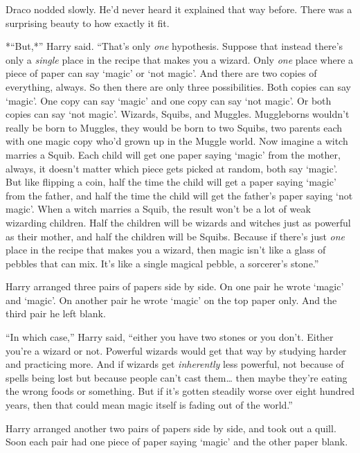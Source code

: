Draco nodded slowly. He'd never heard it explained that way before.
There was a surprising beauty to how exactly it fit.

*``But,*'' Harry said. ``That's only \emph{one} hypothesis. Suppose that
instead there's only a \emph{single} place in the recipe that makes you
a wizard. Only \emph{one} place where a piece of paper can say `magic'
or `not magic'. And there are two copies of everything, always. So then
there are only three possibilities. Both copies can say `magic'. One
copy can say `magic' and one copy can say `not magic'. Or both copies
can say `not magic'. Wizards, Squibs, and Muggles. Muggleborns wouldn't
really be born to Muggles, they would be born to two Squibs, two parents
each with one magic copy who'd grown up in the Muggle world. Now imagine
a witch marries a Squib. Each child will get one paper saying `magic'
from the mother, always, it doesn't matter which piece gets picked at
random, both say `magic'. But like flipping a coin, half the time the
child will get a paper saying `magic' from the father, and half the time
the child will get the father's paper saying `not magic'. When a witch
marries a Squib, the result won't be a lot of weak wizarding children.
Half the children will be wizards and witches just as powerful as their
mother, and half the children will be Squibs. Because if there's just
\emph{one} place in the recipe that makes you a wizard, then magic isn't
like a glass of pebbles that can mix. It's like a single magical pebble,
a sorcerer's stone.''

Harry arranged three pairs of papers side by side. On one pair he wrote
`magic' and `magic'. On another pair he wrote `magic' on the top paper
only. And the third pair he left blank.

``In which case,'' Harry said, ``either you have two stones or you
don't. Either you're a wizard or not. Powerful wizards would get that
way by studying harder and practicing more. And if wizards get
\emph{inherently} less powerful, not because of spells being lost but
because people can't cast them\ldots{} then maybe they're eating the
wrong foods or something. But if it's gotten steadily worse over eight
hundred years, then that could mean magic itself is fading out of the
world.''

Harry arranged another two pairs of papers side by side, and took out a
quill. Soon each pair had one piece of paper saying `magic' and the
other paper blank.

